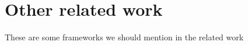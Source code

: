 \section{Other related work}

These are some frameworks we should mention in the related
work~\cite{6061070,LEMENTEC:2011:HAL-00648245:1,ravi2010compiler}
